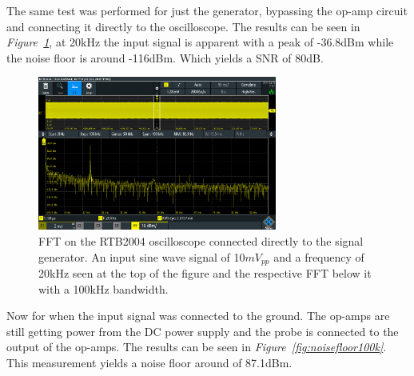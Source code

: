 

The same test was performed for just the generator, bypassing the op-amp circuit and connecting it directly to the oscilloscope.
The results can be seen in \textit{Figure~\ref{fig:NoiseGenerator20kInp100kBand}}, at 20kHz the input signal is apparent with a peak of -36.8dBm while the noise floor is around -116dBm.
Which yields a SNR of 80dB.

\begin{figure}[h]
    \centering
    \includegraphics[width=0.7\textwidth]{graphics/NoiseGenerator20kInp100kBand.PNG}
    \caption{FFT on the RTB2004 oscilloscope connected directly to the signal generator. 
    An input sine wave signal of 10$mV_{pp}$ and a frequency of 20kHz seen at the top of the figure and the respective FFT below it with a 100kHz bandwidth.}
    \label{fig:NoiseGenerator20kInp100kBand}
\end{figure}




Now for when the input signal was connected to the ground.
The op-amps are still getting power from the DC power supply and the probe is connected to the output of the op-amps.
The results can be seen in \textit{Figure~\ref{fig:noisefloor100k}}.
This measurement yields a noise floor around of 87.1dBm.

